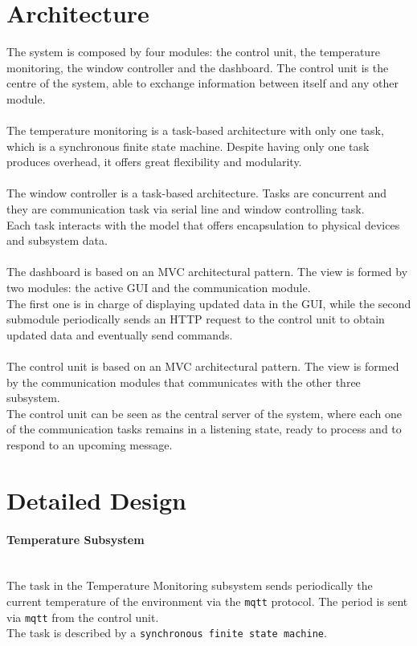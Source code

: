 \documentclass[a4paper,12pt]{report}
\begin{document}
    \section{Architecture}

        The system is composed by four modules: the control unit, the temperature monitoring, the window controller and the dashboard. 
        The control unit is the centre of the system, able to exchange information between itself and any other module.\\\\
        The temperature monitoring is a task-based architecture with only one task, which is a synchronous finite state machine. 
        Despite having only one task produces overhead, it offers great flexibility and modularity.\\\\
        The window controller is a task-based architecture. Tasks are concurrent and they are communication task via serial line and window 
        controlling task.\\
        Each task interacts with the model that offers encapsulation to physical devices and subsystem data.\\\\
        The dashboard is based on an MVC architectural pattern. The view is formed by two modules: the active GUI and the communication 
        module. \\
        The first one is in charge of displaying updated data in the GUI, while the second submodule periodically sends an HTTP request 
        to the control unit to obtain updated data and eventually send commands.\\\\
        The control unit is based on an MVC architectural pattern. The view is formed by the communication modules that communicates 
        with the other three subsystem.\\
        The control unit can be seen as the central server of the system, where each one of the communication tasks remains in a 
        listening state, ready to process and to respond to an upcoming message.

    \section{Detailed Design}

        \paragraph{Temperature Subsystem\\}
            \ \\
            The task in the Temperature Monitoring subsystem sends periodically the current temperature of the environment via the \texttt{mqtt} protocol. 
            The period is sent via \texttt{mqtt} from the control unit.\\
            The task is described by a \texttt{synchronous finite state machine}. 
\end{document}
